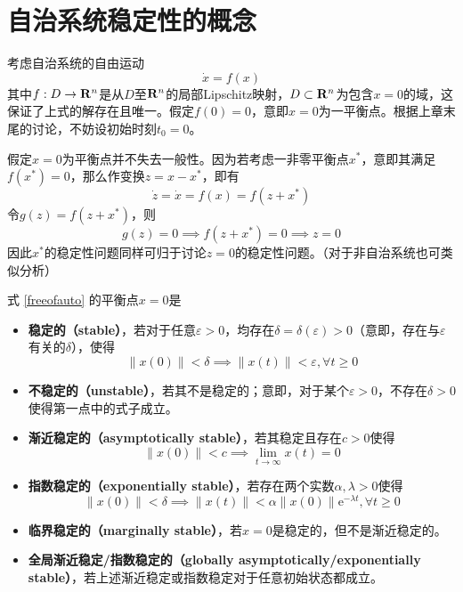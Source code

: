 \section{自治系统稳定性的概念}\label{2Aref}
考虑自治系统的自由运动
\begin{equation}\label{freeofauto}
  \dot{x}=f(x)
\end{equation}
其中$f:D\to\mathbf{R}{}^n$是从$D$至$\mathbf{R}{}^n$的局部Lipschitz映射，$D\subset\mathbf{R}{}^n$为包含$x=0$的域，这保证了上式的解存在且唯一。假定$f(0)=0$，意即$x=0$为一平衡点。根据上章末尾的讨论，不妨设初始时刻$t_0=0$。
\begin{note}
  假定$x=0$为平衡点并不失去一般性。因为若考虑一非零平衡点$x^\ast$，意即其满足$f(x^\ast)=0$，那么作变换$z=x-x^\ast$，即有\[\dot{z}=\dot{x}=f(x)=f(z+x^\ast)\]令$g(z)=f(z+x^\ast)$，则\[g(z)=0\implies f(z+x^\ast)=0\implies z=0\]因此$x^\ast$的稳定性问题同样可归于讨论$z=0$的稳定性问题。（对于非自治系统也可类似分析）
\end{note}
\begin{definition}[自治系统的稳定性]
  式 \eqref{freeofauto} 的平衡点$x=0$是
  \begin{itemize}[leftmargin=1em]
    \item {\bf 稳定的（stable）}，若对于任意$\varepsilon>0$，均存在$\delta=\delta(\varepsilon)>0$（意即，存在与$\varepsilon$有关的$\delta$），使得
    \[\|x(0)\|<\delta\implies \|x(t)\|<\varepsilon,\forall t\ge 0\]
    \item {\bf 不稳定的（unstable）}，若其不是稳定的；意即，对于某个$\varepsilon>0$，不存在$\delta>0$使得第一点中的式子成立。
    \item {\bf 渐近稳定的（asymptotically stable）}，若其稳定且存在$c>0$使得\[\|x(0)\|<c\implies \lim_{t\to\infty}x(t)=0\]
    \item {\bf 指数稳定的（exponentially stable）}，若存在两个实数$\alpha,\lambda>0$使得\[\|x(0)\|<\delta\implies \|x(t)\|<\alpha\|x(0)\|\mathrm{e}^{-\lambda t},\forall t\ge 0\]
    \item {\bf 临界稳定的（marginally stable）}，若$x=0$是稳定的，但不是渐近稳定的。
    \item {\bf 全局渐近稳定/指数稳定的（globally asymptotically/exponentially stable）}，若上述渐近稳定或指数稳定对于任意初始状态都成立。
  \end{itemize}
\end{definition}

